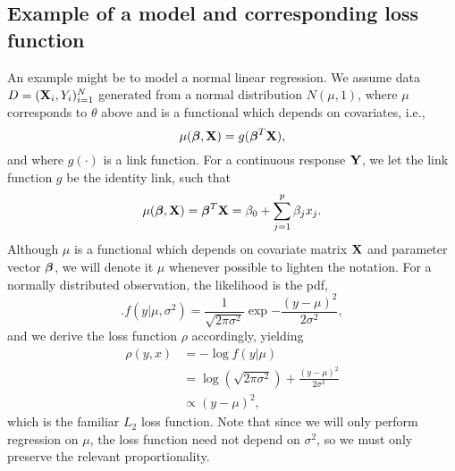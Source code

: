 \subsection{Example of a model and corresponding loss function}
An example might be to model a normal linear regression. We assume data $D=(\mathbf{X}_i,Y_i)_{i=1}^N$ generated from a normal distribution $N(\mu,1)$, where $\mu$ corresponds to $\theta$ above and is a functional which depends on covariates, i.e.,
\begin{equation}
    \mu(\boldsymbol{\beta},\mathbf{X})=g(\boldsymbol{\beta}^T\mathbf{X}),
\end{equation}
and where $g(\cdot)$ is a link function. For a continuous response $\mathbf{Y}$, we let the link function $g$ be the identity link, such that
\begin{equation}
    \mu(\boldsymbol{\beta},\mathbf{X})=\boldsymbol{\beta}^T\mathbf{X}=\beta_0+\sum_{j=1}^p\beta_jx_j.
\end{equation}
Although $\mu$ is a functional which depends on covariate matrix $\mathbf{X}$ and parameter vector $\boldsymbol{\beta}$, we will denote it $\mu$ whenever possible to lighten the notation. For a normally distributed observation, the likelihood is the pdf,
\begin{equation}
    .f(y|\mu,\sigma^2)=\frac{1}{\sqrt{2\pi\sigma^2}}\exp{-\frac{(y-\mu)^2}{2\sigma^2}},
\end{equation}
and we derive the loss function $\rho$ accordingly, yielding
\begin{align*}
    \rho(y,x)&=-\log{f(y|\mu)}\\
    &=\log{(\sqrt{2\pi\sigma^2})}+\frac{(y-\mu)^2}{2\sigma^2} \\
    &\propto(y-\mu)^2,
\end{align*}
which is the familiar $L_2$ loss function. Note that since we will only perform regression on $\mu$, the loss function need not depend on $\sigma^2$, so we must only preserve the relevant proportionality.

